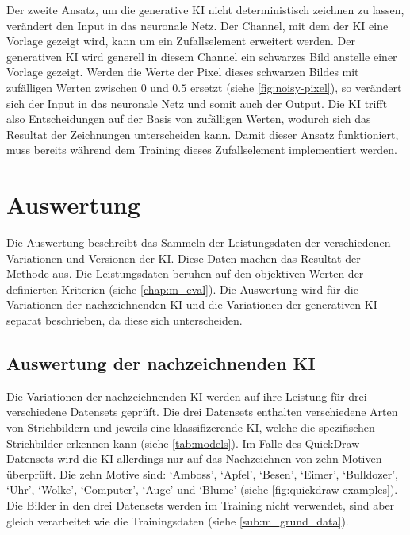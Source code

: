 Der zweite Ansatz, um die generative KI nicht deterministisch zeichnen zu
lassen, verändert den Input in das neuronale Netz. Der Channel, mit dem der KI
eine Vorlage gezeigt wird, kann um ein Zufallselement erweitert werden. Der
generativen KI wird generell in diesem Channel ein schwarzes Bild anstelle einer
Vorlage gezeigt. Werden die Werte der Pixel dieses schwarzen Bildes mit
zufälligen Werten zwischen $0$ und $0.5$ ersetzt (siehe
\autoref{fig:noisy-pixel}), so verändert sich der Input in das neuronale Netz
und somit auch der Output. Die KI trifft also Entscheidungen auf der Basis von
zufälligen Werten, wodurch sich das Resultat der Zeichnungen unterscheiden kann.
Damit dieser Ansatz funktioniert, muss bereits während dem Training dieses
Zufallselement implementiert werden.


\section{Auswertung}\label{chap:m_auswert}
Die Auswertung beschreibt das Sammeln der Leistungsdaten der verschiedenen
Variationen und Versionen der KI. Diese Daten machen das Resultat der Methode
aus. Die Leistungsdaten beruhen auf den objektiven Werten der definierten
Kriterien (siehe \ref{chap:m_eval}). Die Auswertung wird für die
Variationen der nachzeichnenden KI und die Variationen der generativen KI
separat beschrieben, da diese sich unterscheiden.

\subsection{Auswertung der nachzeichnenden KI}\label{sub:m_auswert_nachzeich}
Die Variationen der nachzeichnenden KI werden auf ihre Leistung für drei
verschiedene Datensets geprüft. Die drei Datensets enthalten verschiedene Arten
von Strichbildern und jeweils eine klassifizerende KI, welche die spezifischen
Strichbilder erkennen kann (siehe \autoref{tab:models}). Im Falle des QuickDraw
Datensets wird die KI allerdings nur auf das Nachzeichnen von zehn Motiven
überprüft. Die zehn Motive sind: `Amboss', `Apfel', `Besen', `Eimer',
`Bulldozer', `Uhr', `Wolke', `Computer', `Auge' und `Blume' (siehe
\autoref{fig:quickdraw-examples}). Die Bilder in den drei Datensets werden im
Training nicht verwendet, sind aber gleich verarbeitet wie die Trainingsdaten
(siehe \ref{sub:m_grund_data}).

